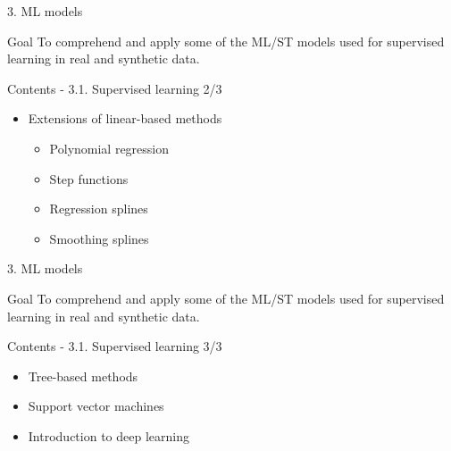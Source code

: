 \documentclass[
  ignorenonframetext,
]{beamer}
\providecommand{\tightlist}{%
  \setlength{\itemsep}{0pt}\setlength{\parskip}{0pt}}\usepackage{longtable,booktabs,array}
\begin{document}
\begin{frame}{3. ML models}
\protect\hypertarget{ml-models-1}{}
\begin{alertblock}{Goal}
\protect\hypertarget{goal-8}{}
To comprehend and apply some of the ML/ST models used for supervised
learning in real and synthetic data.
\end{alertblock}

\begin{exampleblock}{Contents - 3.1. Supervised learning 2/3}
\protect\hypertarget{contents---3.1.-supervised-learning-23}{}
\begin{itemize}
\tightlist
\item
  Extensions of linear-based methods

  \begin{itemize}
  \tightlist
  \item
    Polynomial regression
  \item
    Step functions
  \item
    Regression splines
  \item
    Smoothing splines
  \end{itemize}
\end{itemize}
\end{exampleblock}
\end{frame}

\begin{frame}{3. ML models}
\protect\hypertarget{ml-models-2}{}
\begin{alertblock}{Goal}
\protect\hypertarget{goal-9}{}
To comprehend and apply some of the ML/ST models used for supervised
learning in real and synthetic data.
\end{alertblock}

\begin{exampleblock}{Contents - 3.1. Supervised learning 3/3}
\protect\hypertarget{contents---3.1.-supervised-learning-33}{}
\begin{itemize}
\tightlist
\item
  Tree-based methods
\item
  Support vector machines
\item
  Introduction to deep learning
\end{itemize}
\end{exampleblock}
\end{frame}
\end{document}
